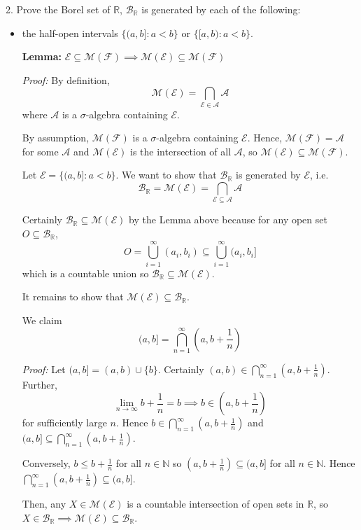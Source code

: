 \documentclass[12pt]{article}
\newcommand{\R}{\mathbb{R}}
\newcommand{\N}{\mathbb{N}}
\newcommand{\Ec}{\mathcal{E}}
\newcommand{\Fc}{\mathcal{F}}
\newcommand{\sub}{\subseteq}
\newcommand{\A}{\mathcal{A}}
\newcommand{\B}{\mathcal{B}}
\newcommand{\M}{\mathcal{M}}
\newenvironment*{proof}[1][blue]{
        \begin{tcolorbox}[
            parbox=false,
            colback=#1!5!white,
            colframe=#1!75!black,
            coltext=#1,
            breakable
        ]}
        {\end{tcolorbox}}
\begin{document}
2. Prove the Borel set of $\R$, $\B_{\R}$ is generated by each of the following:
\begin{itemize}
    \item the half-open intervals $\{(a,b]: a < b\}$ or $\{[a,b): a < b\}$.
    
        \color{blue}
            \textbf{Lemma:} $\Ec \sub \M(\Fc) \implies \M(\Ec) \sub \M(\Fc)$

            \begin{proof}
                \emph{Proof:} By definition, 
                \[\M(\Ec) = \bigcap_{\Ec \in \A} \A\]
                where $\A$ is a $\sigma$-algebra containing $\Ec$.

                By assumption, $\M(\Fc)$ is a $\sigma$-algebra containing $\Ec$. Hence, $\M(\Fc) = \A$ for some $\A$ and $\M(\Ec)$ is the intersection of all $\A$, so $\M(\Ec) \sub \M(\Fc)$.
            \end{proof}

            Let $\Ec = \{(a, b]: a < b\}$. We want to show that $\B_{\R}$ is generated by $\Ec$, i.e. 
            \[\B_{\R} = \M(\Ec) = \bigcap_{\Ec \sub \A} \A \]

            Certainly $\B_{\R} \sub \M(\Ec)$ by the Lemma above because for any open set $O \sub \B_{\R}$, 
            \[O = \bigcup_{i=1}^\infty (a_i, b_i) \sub \bigcup_{i=1}^\infty (a_i, b_i]\]
            which is a countable union so $\B_{\R} \sub \M(\Ec)$.
            
            It remains to show that $\M(\Ec)\sub \B_{\R}$. 

            We claim
            \[(a, b] = \bigcap_{n=1}^{\infty} (a, b + \frac{1}{n})\]

            \begin{proof}
                \emph{Proof:} Let $(a, b] = (a, b) \cup \{b\}$. Certainly $(a, b) \in \bigcap_{n=1}^{\infty} (a, b + \frac{1}{n})$. Further, 
                \[\lim_{n \to \infty} b + \frac{1}{n} = b \implies b \in (a, b + \frac{1}{n})\] 
                for sufficiently large $n$. Hence $b \in \bigcap_{n=1}^{\infty} (a, b + \frac{1}{n})$ and $(a, b] \sub \bigcap_{n=1}^{\infty} (a, b + \frac{1}{n})$. 

                Conversely, $b \leq b + \frac{1}{n}$ for all $n \in \N$ so $(a, b + \frac{1}{n}) \sub (a, b]$ for all $n \in \N$. Hence $\bigcap_{n=1}^{\infty} (a, b + \frac{1}{n}) \sub (a, b]$.
            \end{proof}

            Then, any $X \in \M(\Ec)$ is a countable intersection of open sets in $\R$, so $X \in \B_{\R} \implies \M(\Ec) \sub \B_{\R}$.     
            

\end{itemize}
\end{document}
